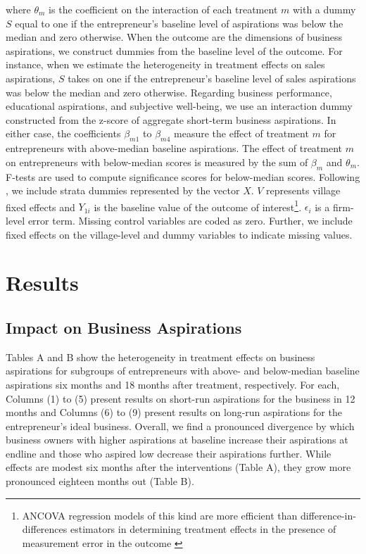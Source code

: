 \documentclass[11.5pt]{article}
\begin{document}
where $\theta_m$ is the coefficient on the interaction of each treatment $m$ with a dummy $S$ equal to one if the entrepreneur's baseline level of aspirations was below the median and zero otherwise. When the outcome are the dimensions of business aspirations, we construct dummies from the baseline level of the outcome. For instance, when we estimate the heterogeneity in treatment effects on sales aspirations, $S$ takes on one if the entrepreneur's baseline level of sales aspirations was below the median and zero otherwise. Regarding business performance, educational aspirations, and subjective well-being, we use an interaction dummy constructed from the z-score of aggregate short-term business aspirations. In either case, the coefficients $\beta_{m1}$ to $\beta_{m4}$ measure the effect of treatment $m$ for entrepreneurs with above-median baseline aspirations. The effect of treatment $m$ on entrepreneurs with below-median scores is measured by the sum of $\beta_m$ and $\theta_m$. %
F-tests are used to compute significance scores for below-median scores. Following \citet{Bruhn2009}, we include strata dummies represented by the vector $X$. $V$ represents village fixed effects and $Y_{1i}$ is the baseline value of the outcome of interest\footnote{ANCOVA regression models of this kind are more efficient than difference-in-differences estimators in determining treatment effects in the presence of measurement error in the outcome \citep{McKenzie2012}}. $\epsilon_i$ is a firm-level error term. Missing control variables are coded as zero. Further, we include fixed effects on the village-level and dummy variables to indicate missing values.


\section{Results}\label{sec.analysis}

\subsection{Impact on Business Aspirations}

Tables A and B show the heterogeneity in treatment effects on business aspirations for subgroups of entrepreneurs with above- and below-median baseline aspirations six months and 18 months after treatment, respectively. %
For each, Columns (1) to (5) present results on short-run aspirations for the business in 12 months and Columns (6) to (9) present results on long-run aspirations for the entrepreneur's ideal business. Overall, we find a pronounced divergence by which business owners with higher aspirations at baseline increase their aspirations at endline and those who aspired low decrease their aspirations further. While effects are modest six months after the interventions (Table A), they grow more pronounced eighteen months out (Table B).
\end{document}
